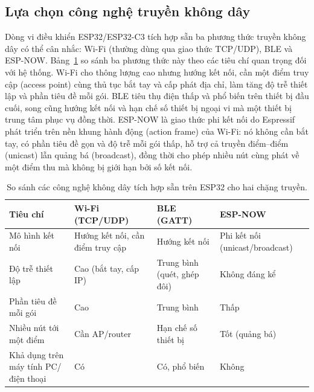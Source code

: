 \documentclass[../DoAn.tex]{subfiles}
\begin{document}
\subsection{Lựa chọn công nghệ truyền không dây}
\label{subsec:tx_choncongnghe}
Dòng vi điều khiển ESP32/ESP32-C3 tích hợp sẵn ba phương thức truyền không dây có
thể cân nhắc: Wi-Fi (thường dùng qua giao thức TCP/UDP), BLE và ESP-NOW.
Bảng~\ref{tab:wireless} so sánh ba phương thức này theo các tiêu chí quan trọng
đối với hệ thống. Wi-Fi cho thông lượng cao nhưng hướng kết nối, cần một điểm
truy cập (access point) cùng thủ tục bắt tay và cấp phát địa chỉ, làm tăng độ trễ
thiết lập và phần tiêu đề mỗi gói. BLE tiêu thụ điện thấp và phổ biến trên thiết
bị đầu cuối, song cũng hướng kết nối và hạn chế số thiết bị ngoại vi mà một thiết
bị trung tâm phục vụ đồng thời. ESP-NOW là giao thức phi kết nối do Espressif phát triển trên nền khung hành động (action frame) của Wi-Fi: nó không cần bắt tay, có phần tiêu đề gọn và độ trễ mỗi gói thấp, hỗ trợ cả truyền điểm--điểm (unicast) lẫn quảng bá (broadcast), đồng thời cho phép nhiều nút cùng phát về một điểm thu mà không bị giới hạn bởi số kết nối.

\begin{table}[h]
    \centering
    \caption{So sánh các công nghệ không dây tích hợp sẵn trên ESP32 cho hai chặng truyền.}
    \label{tab:wireless}
    \begin{tabular}{p{3.2cm} p{3.4cm} p{3.4cm} p{3.4cm}}
        \hline
        \textbf{Tiêu chí}                    & \textbf{Wi-Fi (TCP/UDP)}         & \textbf{BLE (GATT)}         & \textbf{ESP-NOW}                \\
        \hline
        Mô hình kết nối                      & Hướng kết nối, cần điểm truy cập & Hướng kết nối               & Phi kết nối (unicast/broadcast) \\
        Độ trễ thiết lập                     & Cao (bắt tay, cấp IP)            & Trung bình (quét, ghép đôi) & Không đáng kể                   \\
        Phần tiêu đề mỗi gói                 & Cao                              & Trung bình                  & Thấp                            \\
        Nhiều nút tới một điểm               & Cần AP/router                    & Hạn chế số thiết bị         & Tốt (quảng bá)                  \\
        Khả dụng trên máy tính PC/điện thoại & Có                               & Có, phổ biến                & Không                           \\
        \hline
    \end{tabular}
\end{table}
\end{document}
